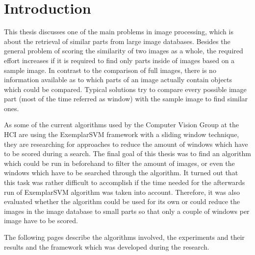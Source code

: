 \chapter{Introduction}


This thesis discusses one of the main problems in image processing, which is about the retrieval of similar parts from large image databases.
Besides the general problem of scoring the similarity of two images as a whole, the required effort increases if it is required to find only parts inside of images based on a sample image. In contrast to the comparison of full images, there is no information available as to which parts of an image actually contain objects which could be compared.
Typical solutions try to compare every possible image part (most of the time referred as window) with the sample image to find similar ones.
\bigskip

As some of the current algorithms used by the Computer Vision Group at the \ac{HCI} are using the ExemplarSVM \cite{Malisiewicz2011} framework with a sliding window technique, they are researching for approaches to reduce the amount of windows which have to be scored during a search. 
The final goal of this thesis was to find an algorithm which could be run in beforehand to filter the amount of images, or even the windows which have to be searched through the algorithm. It turned out that this task was rather difficult to accomplish if the time needed for the afterwards run of ExemplarSVM algorithm was taken into account. Therefore, it was also evaluated whether the algorithm could be used for its own or could reduce the images in the image database to small parts so that only a couple of windows per image have to be scored.

The following pages describe the algorithms involved, the experiments and their results and the framework which was developed during the research.
